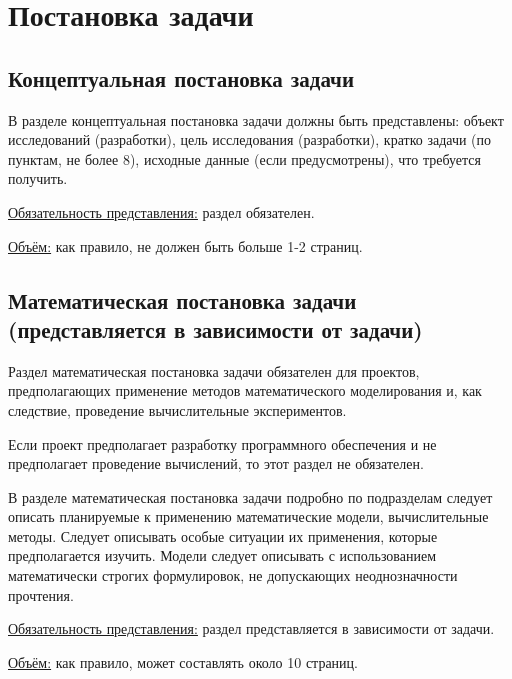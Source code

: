 \chapter{Постановка задачи}
\section{Концептуальная постановка задачи}

В разделе концептуальная постановка задачи должны быть представлены: объект исследований (разработки), цель исследования (разработки), кратко задачи (по пунктам, не более 8), исходные данные (если предусмотрены), что требуется получить.

\underline{Обязательность представления:} раздел обязателен. 

\underline{Объём:} как правило, не должен быть больше 1-2 страниц.

\section{Математическая постановка задачи (представляется в зависимости от задачи)}

Раздел математическая постановка задачи обязателен для проектов, предполагающих применение методов математического моделирования и, как следствие, проведение вычислительные экспериментов.

Если проект предполагает разработку программного обеспечения и не предполагает проведение вычислений, то этот раздел не обязателен.

В разделе математическая постановка задачи подробно по подразделам следует описать планируемые к применению математические модели, вычислительные методы. 
Следует описывать особые ситуации их применения, которые предполагается изучить.
Модели следует описывать с использованием математически строгих формулировок, не допускающих неоднозначности прочтения.

\underline{Обязательность представления:} раздел представляется в зависимости от задачи. 

\underline{Объём:} как правило, может составлять около 10 страниц.


